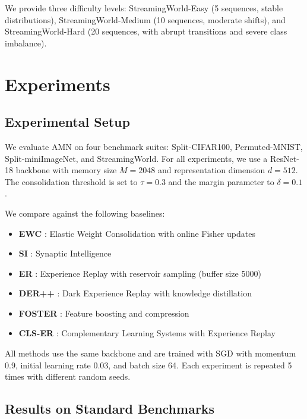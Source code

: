 \documentclass[11pt]{article}
\begin{document}
We provide three difficulty levels: StreamingWorld-Easy (5 sequences, stable distributions), StreamingWorld-Medium (10 sequences, moderate shifts), and StreamingWorld-Hard (20 sequences, with abrupt transitions and severe class imbalance).

\section{Experiments}
\label{sec:experiments}

\subsection{Experimental Setup}

We evaluate AMN on four benchmark suites: Split-CIFAR100, Permuted-MNIST, Split-miniImageNet, and StreamingWorld. For all experiments, we use a ResNet-18 backbone with memory size $M = 2048$ and representation dimension $d = 512$. The consolidation threshold is set to $\tau = 0.3$ and the margin parameter to $\delta = 0.1$.

We compare against the following baselines:
\begin{itemize}
    \item \textbf{EWC} \citep{kirkpatrick2017overcoming}: Elastic Weight Consolidation with online Fisher updates
    \item \textbf{SI} \citep{zenke2017continual}: Synaptic Intelligence
    \item \textbf{ER} \citep{rolnick2019experience}: Experience Replay with reservoir sampling (buffer size 5000)
    \item \textbf{DER++} \citep{buzzega2020dark}: Dark Experience Replay with knowledge distillation
    \item \textbf{FOSTER} \citep{wang2022foster}: Feature boosting and compression
    \item \textbf{CLS-ER} \citep{arani2022learning}: Complementary Learning Systems with Experience Replay
\end{itemize}

All methods use the same backbone and are trained with SGD with momentum 0.9, initial learning rate 0.03, and batch size 64. Each experiment is repeated 5 times with different random seeds.

\subsection{Results on Standard Benchmarks}
\end{document}
